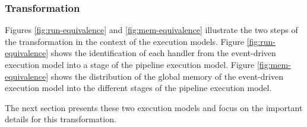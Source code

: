 \subsubsection{Transformation}

Figures \ref{fig:run-equivalence} and \ref{fig:mem-equivalence} illustrate the two steps of the transformation in the context of the execution models.
Figure \ref{fig:run-equivalence} shows the identification of each handler from the event-driven execution model into a stage of the pipeline execution model.
Figure \ref{fig:mem-equivalence} shows the distribution of the global memory of the event-driven execution model into the different stages of the pipeline execution model.

The next section presents these two execution models and focus on the important details for this transformation.



